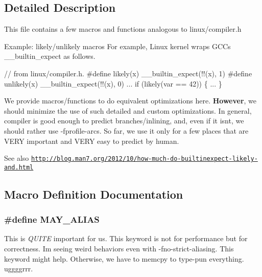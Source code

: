 \subsection{Detailed Description}
This file contains a few macros and functions analogous to linux/compiler.\+h \begin{DoxyParagraph}{Example\+: likely/unlikely macros}
For example, Linux kernel wraps G\+CC\textquotesingle{}s \+\_\+\+\_\+builtin\+\_\+expect as follows. 
\begin{DoxyCode}
\textcolor{comment}{// from linux/compiler.h.}
\textcolor{preprocessor}{#define likely(x)      \_\_builtin\_expect(!!(x), 1)}
\textcolor{preprocessor}{#define unlikely(x)    \_\_builtin\_expect(!!(x), 0)}
...
if (likely(var == 42)) \{
  ...
\}
\end{DoxyCode}
 We provide macros/functions to do equivalent optimizations here. {\bfseries However}, we should minimize the use of such detailed and custom optimizations. In general, compiler is good enough to predict branches/inlining, and, even if it isn\textquotesingle{}t, we should rather use -\/fprofile-\/arcs. So far, we use it only for a few places that are V\+E\+RY important and V\+E\+RY easy to predict by human.
\end{DoxyParagraph}
\begin{DoxySeeAlso}{See also}
\href{http://blog.man7.org/2012/10/how-much-do-builtinexpect-likely-and.html}{\tt http\+://blog.\+man7.\+org/2012/10/how-\/much-\/do-\/builtinexpect-\/likely-\/and.\+html} 
\end{DoxySeeAlso}


\subsection{Macro Definition Documentation}
\subsubsection[{\texorpdfstring{M\+A\+Y\+\_\+\+A\+L\+I\+AS}{MAY_ALIAS}}]{\setlength{\rightskip}{0pt plus 5cm}\#define M\+A\+Y\+\_\+\+A\+L\+I\+AS}\hypertarget{group__COMPILER_ga6747712d26181b3a549cb55a69c3f4cb}{}\label{group__COMPILER_ga6747712d26181b3a549cb55a69c3f4cb}
This is {\itshape Q\+U\+I\+TE} important for us. This keyword is not for performance but for correctness. I\textquotesingle{}m seeing weird behaviors even with -\/fno-\/strict-\/aliasing. This keyword might help. Otherwise, we have to memcpy to type-\/pun everything. uggggrrr. 
